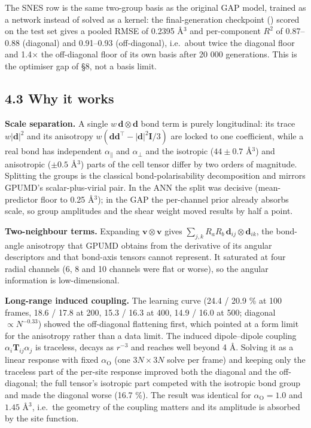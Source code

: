 \documentclass[11pt,a4paper]{article}
\begin{document}
The SNES row is the same two-group basis as the original GAP model, trained as a network instead of
solved as a kernel: the final-generation checkpoint
() scored on the test set gives a pooled RMSE of
0.2395 \AA{}\(^3\) and per-component \(R^2\) of 0.87--0.88 (diagonal) and 0.91--0.93 (off-diagonal),
i.e.~about twice the diagonal floor and 1.4\(\times\) the off-diagonal floor of its own basis after
20 000 generations. This is the optimiser gap of §8, not a basis limit.

\subsection{4.3 Why it works}\label{why-it-works}

\textbf{Scale separation.} A single \(w\,\mathbf d\otimes\mathbf d\) bond term is purely
longitudinal: its trace \(w|\mathbf d|^2\) and its anisotropy
\(w(\mathbf d\mathbf d^\top-|\mathbf d|^2\mathbf I/3)\) are locked to one coefficient, while a real
bond has independent \(\alpha_\parallel\) and \(\alpha_\perp\) and the isotropic (\(44\pm0.7\)
\AA{}\(^3\)) and anisotropic (\(\pm0.5\) \AA{}\(^3\)) parts of the cell tensor differ by two orders
of magnitude. Splitting the groups is the classical bond-polarisability decomposition and mirrors
GPUMD's scalar-plus-virial pair. In the ANN the split was decisive (mean-predictor floor to 0.25
\AA{}\(^3\)); in the GAP the per-channel prior already absorbs scale, so group amplitudes and the
shear weight moved results by half a point.

\textbf{Two-neighbour terms.} Expanding \(\mathbf v\otimes\mathbf v\) gives
\(\sum_{j,k}R_aR_b\,\mathbf d_{ij}\otimes\mathbf d_{ik}\), the bond-angle anisotropy that GPUMD
obtains from the derivative of its angular descriptors and that bond-axis tensors cannot represent.
It saturated at four radial channels (6, 8 and 10 channels were flat or worse), so the angular
information is low-dimensional.

\textbf{Long-range induced coupling.} The learning curve (24.4 / 20.9 \% at 100 frames, 18.6 / 17.8
at 200, 15.3 / 16.3 at 400, 14.9 / 16.0 at 500; diagonal \(\propto N^{-0.33}\)) showed the
off-diagonal flattening first, which pointed at a form limit for the anisotropy rather than a data
limit. The induced dipole--dipole coupling \(\alpha_i\mathbf T_{ij}\alpha_j\) is traceless, decays
as \(r^{-3}\) and reaches well beyond 4 \AA{}. Solving it as a linear response with fixed
\(\alpha_\mathrm O\) (one \(3N\times3N\) solve per frame) and keeping only the traceless part of the
per-site response improved both the diagonal and the off-diagonal; the full tensor's isotropic part
competed with the isotropic bond group and made the diagonal worse (16.7 \%). The result was
identical for \(\alpha_\mathrm O = 1.0\) and \(1.45\) \AA{}\(^3\), i.e.~the geometry of the coupling
matters and its amplitude is absorbed by the site function.
\end{document}
